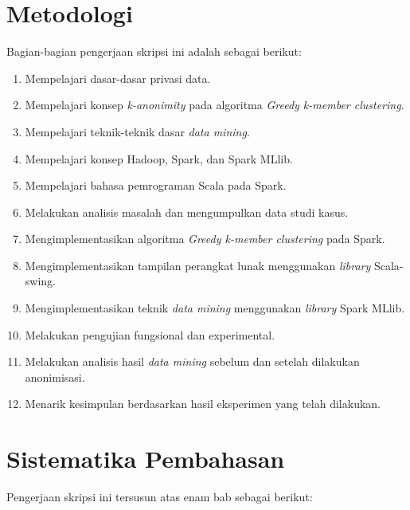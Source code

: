 \section{Metodologi}
\label{sec:metlit}
Bagian-bagian pengerjaan skripsi ini adalah sebagai berikut:
\begin{enumerate}
\item Mempelajari dasar-dasar privasi data.
\item Mempelajari konsep {\it k-anonimity} pada algoritma {\it Greedy k-member clustering}.
\item Mempelajari teknik-teknik dasar {\it data mining}.
\item Mempelajari konsep Hadoop, Spark, dan Spark MLlib.
\item Mempelajari bahasa pemrograman Scala pada Spark.
\item Melakukan analisis masalah dan mengumpulkan data studi kasus.
\item Mengimplementasikan algoritma {\it Greedy k-member clustering } pada Spark.
\item Mengimplementasikan tampilan perangkat lunak menggunakan {\it library} Scala-swing.
\item Mengimplementasikan teknik {\it data mining} menggunakan {\it library} Spark MLlib.
\item Melakukan pengujian fungsional dan experimental.
\item Melakukan analisis hasil {\it data mining} sebelum dan setelah dilakukan anonimisasi.
\item Menarik kesimpulan berdasarkan hasil eksperimen yang telah dilakukan.
\end{enumerate}

\section{Sistematika Pembahasan}
\label{sec:sispem}
Pengerjaan skripsi ini tersusun atas enam bab sebagai berikut:

